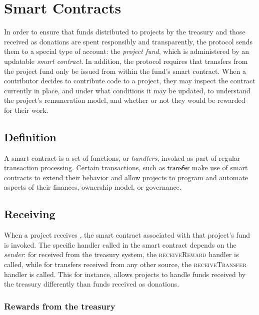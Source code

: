 \section{Smart Contracts}
\label{s:smart-contracts}

\newcommand{\handler}[1]{\textsc{\small#1}}

In order to ensure that funds distributed to projects by the \oscoin{} treasury
and those received as donations are spent responsibly and transparently, the
\oscoin{} protocol sends them to a special type of account: the \emph{project
fund}, which is administered by an updatable \emph{smart contract}.
In addition, the protocol requires that transfers from the project fund only be
issued from within the fund's smart contract. When a contributor decides to
contribute code to a project, they may inspect the contract currently in place,
and under what conditions it may be updated, to understand the project's
remuneration model, and whether or not they would be rewarded for their work.

\subsection{Definition}
A smart contract is a set of functions, or \emph{handlers}, invoked as part
of regular transaction processing. Certain transactions, such as $\mathsf{transfer}$
make use of smart contracts to extend their behavior and allow projects to
program and automate aspects of their finances, ownership model, or governance.

\subsection{Receiving \oscoin{}}

When a project receives \oscoin{}, the smart contract associated with that
project's fund is invoked. The specific handler called in the smart contract
depends on the \emph{sender}: for \oscoin{} received from the treasury system,
the \handler{receiveReward} handler is called, while for transfers received
from any other source, the \handler{receiveTransfer} handler is called. This
for instance, allows projects to handle funds received by the treasury differently
than funds received as donations.

\subsubsection{Rewards from the treasury}

